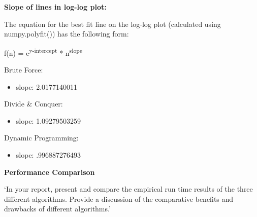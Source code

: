 \documentclass[letterpaper,10pt,titlepage,fleqn]{article}
\begin{document}
\newpage

\begin{centering}
\textbf{Slope of lines in log-log plot:}
\end{centering}

The equation for the best fit line on the log-log plot (calculated using numpy.polyfit()) has the following form:

f(n) = e\textsuperscript{y-intercept} * n\textsuperscript{slope}

Brute Force:
\begin{itemize}
\item slope: 2.0177140011
\end{itemize}

Divide \& Conquer:
\begin{itemize}
\item slope: 1.09279503259
\end{itemize}

Dynamic Programming:
\begin{itemize}
\item slope: .996887276493
\end{itemize}

\begin{centering}
\textbf{Performance Comparison}
\end{centering}

`In your report, present and compare the empirical run time results of the
three different algorithms. Provide a discussion of the comparative benefits and
drawbacks of different algorithms.'
\end{document}
